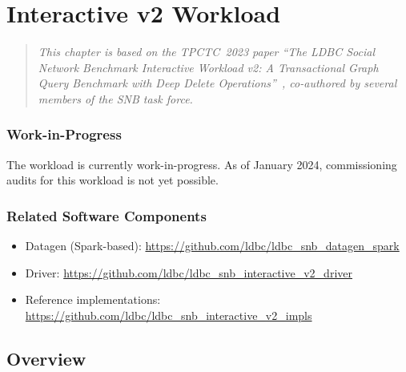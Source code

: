 \chapter{Interactive v2 Workload}
\label{sec:interactive-v2}

\begin{quote}
    \textit{This chapter is based on the TPCTC~2023 paper ``The LDBC Social Network Benchmark Interactive Workload v2: A Transactional Graph Query Benchmark with Deep Delete Operations''~\cite{DBLP:journals/corr/abs-2307-04820}, co-authored by several members of the SNB task force.}
\end{quote}

\subsection*{Work-in-Progress}

The \interactivevtwo workload is currently work-in-progress.
As of January 2024, commissioning audits for this workload is not yet possible.

\subsection*{Related Software Components}

\begin{itemize}
    \item Datagen (Spark-based): \url{https://github.com/ldbc/ldbc_snb_datagen_spark}
    \item Driver: \url{https://github.com/ldbc/ldbc_snb_interactive_v2_driver}
    \item Reference implementations: \url{https://github.com/ldbc/ldbc_snb_interactive_v2_impls}
\end{itemize}


\section{Overview}

